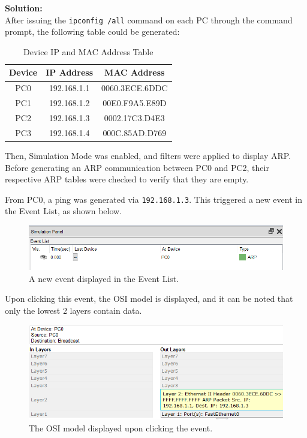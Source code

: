 \documentclass[a4paper,12pt]{article}
\begin{document}
\textbf{Solution:} \\
After issuing the \texttt{ipconfig /all} command on each PC through the command prompt, the following table could be generated:
\begin{table}[H]
\centering
\begin{tabular}{|c|c|c|}
\hline
\textbf{Device} & \textbf{IP Address} & \textbf{MAC Address} \\ \hline
PC0 & 192.168.1.1 & 0060.3ECE.6DDC \\ \hline
PC1 & 192.168.1.2 & 00E0.F9A5.E89D \\ \hline
PC2 & 192.168.1.3 & 0002.17C3.D4E3 \\ \hline
PC3 & 192.168.1.4 & 000C.85AD.D769 \\ \hline
\end{tabular}
\caption{Device IP and MAC Address Table}
\end{table}

Then, Simulation Mode was enabled, and filters were applied to display ARP.
Before generating an ARP communication between PC0 and PC2, their respective ARP tables were checked to verify that they are empty.

From PC0, a ping was generated via \texttt{192.168.1.3}. This triggered a new event in the Event List, as shown below. 
\begin{figure}[H]
\centering
\includegraphics[width=\linewidth,keepaspectratio]{Pictures_Lab1/Event List obj 6 .png}
\caption{A new event displayed in the Event List.}
\end{figure}

Upon clicking this event, the OSI model is displayed, and it can be noted that only the lowest 2 layers contain data.
\begin{figure}[H]
\centering
\includegraphics[width=\linewidth,keepaspectratio]{Pictures_Lab1/OSI obj 6 .png}
\caption{The OSI model displayed upon clicking the event.}
\end{figure}
\end{document}
